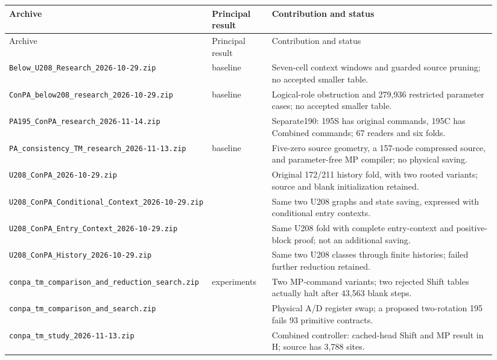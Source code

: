 \begingroup\footnotesize
\begin{longtable}{@{}>{\raggedright\arraybackslash}p{0.37\linewidth}>{\raggedright\arraybackslash}p{0.12\linewidth}>{\raggedright\arraybackslash}p{0.45\linewidth}@{}}
\toprule Archive & Principal result & Contribution and status \\
\midrule\endfirsthead
\toprule Archive & Principal result & Contribution and status \\
\midrule\endhead
\bottomrule\endfoot
\nolinkurl{Below_U208_Research_2026-10-29.zip} & 208 baseline & Seven-cell context windows and guarded source pruning; no accepted smaller table.\\[3pt]
\nolinkurl{ConPA_below208_research_2026-10-29.zip} & 208 baseline & Logical-role obstruction and 279,936 restricted parameter cases; no accepted smaller table.\\[3pt]
\nolinkurl{PA195_ConPA_research_2026-11-14.zip} & 195 & Separate190: 195S has original commands, 195C has Combined commands; 67 readers and six folds.\\[3pt]
\nolinkurl{PA_consistency_TM_research_2026-11-13.zip} & 196 baseline & Five-zero source geometry, a 157-node compressed source, and parameter-free MP compiler; no physical saving.\\[3pt]
\nolinkurl{U208_ConPA_2026-10-29.zip} & 208 & Original 172/211 history fold, with two rooted variants; source and blank initialization retained.\\[3pt]
\nolinkurl{U208_ConPA_Conditional_Context_2026-10-29.zip} & 208 & Same two U208 graphs and state saving, expressed with conditional entry contexts.\\[3pt]
\nolinkurl{U208_ConPA_Entry_Context_2026-10-29.zip} & 208 & Same U208 fold with complete entry-context and positive-block proof; not an additional saving.\\[3pt]
\nolinkurl{U208_ConPA_History_2026-10-29.zip} & 208 & Same two U208 classes through finite histories; failed further reduction retained.\\[3pt]
\nolinkurl{conpa_tm_comparison_and_reduction_search.zip} & 196 experiments & Two MP-command variants; two rejected Shift tables actually halt after 43,563 blank steps.\\[3pt]
\nolinkurl{conpa_tm_comparison_and_search.zip} & 196 & Physical A/D register swap; a proposed two-rotation 195 fails 93 primitive contracts.\\[3pt]
\nolinkurl{conpa_tm_study_2026-11-13.zip} & 196 & Combined controller: cached-head Shift and MP result in H; source has 3,788 sites.\\[3pt]

\end{longtable}
